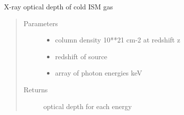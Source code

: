 \documentclass[letterpaper,10pt,english]{sphinxmanual}
\begin{document}

\begin{fulllineitems}
\label{\detokenize{astro_functions:astro.ismtau}}
X-ray optical depth of cold ISM gas
\begin{quote}\begin{description}
\item[{Parameters}] \leavevmode\begin{itemize}
\item {} 
 \textendash{} column density 10**21 cm-2 at redshift z

\item {} 
 \textendash{} redshift of source

\item {} 
 \textendash{} array of photon energies keV

\end{itemize}

\item[{Returns}] \leavevmode
optical depth for each energy

\end{description}\end{quote}

\end{fulllineitems}

\end{document}
